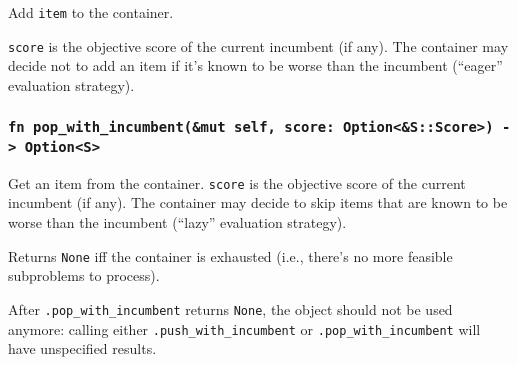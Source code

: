 Add \texttt{item} to the container.

\texttt{score} is the objective score of the current incumbent (if any). The container may decide not to add an item if it’s known to be worse than the incumbent (``eager'' evaluation strategy).

\subsubsection*{\texttt{fn pop\_with\_incumbent(\&mut self, score: Option<\&S::Score>) -> Option<S>}}

Get an item from the container. \texttt{score} is the objective score of the current incumbent (if any). The container may decide to skip items that are known to be worse than the incumbent (“lazy” evaluation strategy).

Returns \texttt{None} iff the container is exhausted (i.e., there’s no more feasible subproblems to process).

After \texttt{.pop\_with\_incumbent} returns \texttt{None}, the object should not be used anymore: calling either \texttt{.push\_with\_incumbent} or \texttt{.pop\_with\_incumbent} will have unspecified results.
